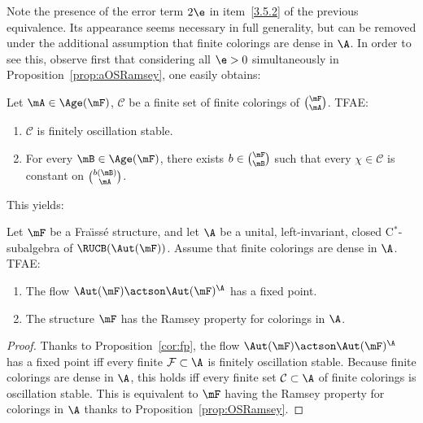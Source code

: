 Note the presence of the error term $2\e$ in item~\eqref{3.5.2} of the previous equivalence. Its appearance seems necessary in full generality, but can be removed under the additional assumption that finite colorings are dense in $\A$. In order to see this, observe first that considering all $\e>0$ simultaneously in Proposition~\ref{prop:aOSRamsey}, one easily obtains:

\begin{prop}\label{prop:OSRamsey}
Let $\mA \in \Age(\mF)$, $\mathcal C$ be a finite set of finite colorings of $\binom{\mF}{\mA}$. TFAE:
\begin{enumerate}
\item $\mathcal C$ is finitely oscillation stable.
\item For every $\mB \in \Age(\mF)$, there exists $b\in \binom{\mF}{\mB}$ such that every $\chi\in \mathcal C$ is constant on $\binom{b(\mB)}{\mA}$.
\end{enumerate}
\end{prop}

This yields:

\begin{prop}\label{cor:fpRP}
Let $\mF$ be a Fra\"{\i}ss\'e structure, and let $\A$ be a unital, left-invariant, closed C$^{*}$-subalgebra of $\RUCB(\Aut(\mF))$. Assume that finite colorings are dense in $\A$. TFAE:
\begin{enumerate}
\item \label{3.7.1} The flow $\Aut(\mF)\actson \Aut(\mF)^{\A}$ has a fixed point.
\item \label{3.7.2} The structure $\mF$ has the Ramsey property for colorings in $\A$.
\end{enumerate}
\end{prop}

\begin{proof}
Thanks to Proposition~\ref{cor:fp}, the flow $\Aut(\mF)\actson \Aut(\mF)^{\A}$ has a fixed point iff every finite $\mathcal F\subset \A$ is finitely oscillation stable. Because finite colorings are dense in $\A$, this holds iff every finite set $\mathcal C \subset \A$ of finite colorings is oscillation stable. This is equivalent to $\mF$ having the Ramsey property for colorings in $\A$ thanks to Proposition~\ref{prop:OSRamsey}.
\end{proof}

